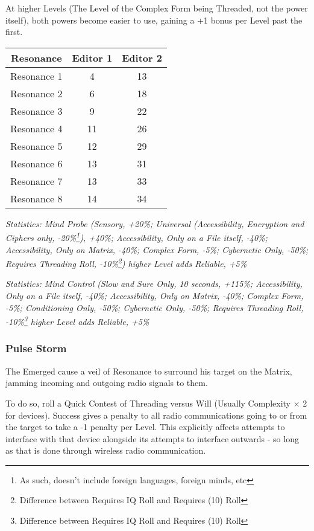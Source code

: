 \begin{multicols*}{3}
	At higher Levels (The Level of the Complex Form being Threaded, not the power itself), both powers become easier to use, gaining a +1 bonus per Level past the first.
	
	\begin{center}
		\begin{tabular}{|c|c|c|}
			\hline
			Resonance & Editor 1 & Editor 2 \\
			\hline
			\hline
			Resonance 1 & 4 & 13 \\
			Resonance 2 & 6 & 18 \\
			Resonance 3 & 9 & 22 \\
			Resonance 4 & 11 & 26 \\
			Resonance 5 & 12 & 29 \\
			Resonance 6 & 13 & 31 \\
			Resonance 7 & 13 & 33 \\
			Resonance 8 & 14 & 34 \\
			\hline
		\end{tabular}
	\end{center}
	
	\textcolor{OliveGreen}{\textit{Statistics: Mind Probe (Sensory, +20\%; Universal (Accessibility, Encryption and Ciphers only, -20\%\footnote{As such, doesn't include foreign languages, foreign minds, etc}), +40\%; Accessibility, Only on a File itself, -40\%; Accessibility, Only on Matrix, -40\%; Complex Form, -5\%; Cybernetic Only, -50\%; Requires Threading Roll, -10\%\footnote{Difference between Requires IQ Roll and Requires (10) Roll}) higher Level adds Reliable, +5\%}}
			
	\textcolor{OliveGreen}{\textit{Statistics: Mind Control (Slow and Sure Only, 10 seconds, +115\%; Accessibility, Only on a File itself, -40\%; Accessibility, Only on Matrix, -40\%; Complex Form, -5\%; Conditioning Only, -50\%; Cybernetic Only, -50\%; Requires Threading Roll, -10\%\footnote{Difference between Requires IQ Roll and Requires (10) Roll} higher Level adds Reliable, +5\%}}
	
	\subsubsection*{Pulse Storm}\label{pulse_storm}
	
	The Emerged cause a veil of Resonance to surround his target on the Matrix, jamming incoming and outgoing radio signals to them.
	
	To do so, roll a Quick Contest of Threading versus Will (Usually Complexity $\times$ 2 for devices). Success gives a penalty to all radio communications going to or from the target to take a -1 penalty per Level. This explicitly affects attempts to interface with that device alongside its attempts to interface outwards - so long as that is done through wireless radio communication.
	

\end{multicols*}
